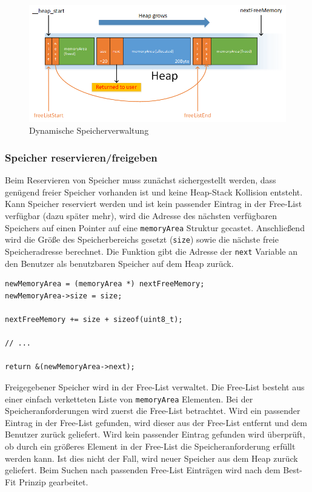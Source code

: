\documentclass[fontsize=12pt, toc=bibliography, notitlepage]{scrreprt}
\begin{document}
\begin{figure}[H]
	\centering
	\includegraphics[width=450px]{images/memory.png}
	\caption{Dynamische Speicherverwaltung}
	\label{fig:memory}
\end{figure}

\subsubsection{Speicher reservieren/freigeben}
Beim Reservieren von Speicher muss zunächst sichergestellt werden, dass genügend freier Speicher vorhanden ist und keine Heap-Stack Kollision entsteht. Kann Speicher reserviert werden und ist kein passender Eintrag in der Free-List verfügbar (dazu später mehr), wird die Adresse des nächsten verfügbaren Speichers auf einen Pointer auf eine \lstinline$memoryArea$ Struktur gecastet. Anschließend wird die Größe des Speicherbereichs gesetzt (\lstinline$size$)  sowie die nächste freie Speicheradresse berechnet. Die Funktion gibt die Adresse der \lstinline$next$ Variable an den Benutzer als benutzbaren Speicher auf dem Heap zurück.

\begin{lstlisting}[title=memory.c]
newMemoryArea = (memoryArea *) nextFreeMemory;
newMemoryArea->size = size;

nextFreeMemory += size + sizeof(uint8_t);

// ...

return &(newMemoryArea->next);
\end{lstlisting}

Freigegebener Speicher wird in der Free-List verwaltet. Die Free-List besteht aus einer einfach verketteten Liste von \lstinline$memoryArea$ Elementen. Bei der Speicheranforderungen wird zuerst die Free-List betrachtet. Wird ein passender Eintrag in der Free-List gefunden, wird dieser aus der Free-List entfernt und dem Benutzer zurück geliefert. Wird kein passender Eintrag gefunden wird überprüft, ob durch ein größeres Element in der Free-List die Speicheranforderung erfüllt werden kann. Ist dies nicht der Fall, wird neuer Speicher aus dem Heap zurück geliefert. Beim Suchen nach passenden Free-List Einträgen wird nach dem Best-Fit Prinzip gearbeitet.\\
\end{document}
